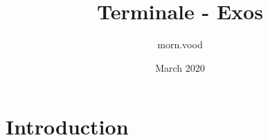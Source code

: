 \documentclass{article}
\title{Terminale - Exos}
\author{morn.vood }
\date{March 2020}
\begin{document}
\maketitle

\section{Introduction}
\end{document}
